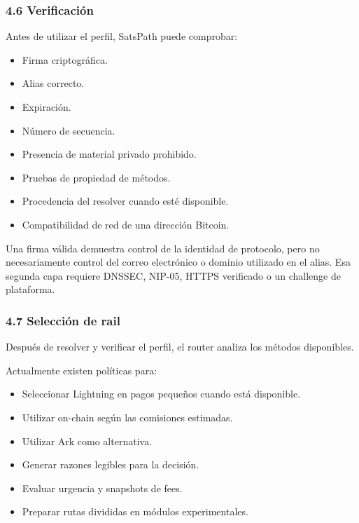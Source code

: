 \documentclass[
]{article}
\providecommand{\tightlist}{%
  \setlength{\itemsep}{0pt}\setlength{\parskip}{0pt}}
\begin{document}
\hypertarget{verificaciuxf3n}{%
\subsubsection{4.6 Verificación}\label{verificaciuxf3n}}

Antes de utilizar el perfil, SatsPath puede comprobar:

\begin{itemize}
\tightlist
\item
  Firma criptográfica.
\item
  Alias correcto.
\item
  Expiración.
\item
  Número de secuencia.
\item
  Presencia de material privado prohibido.
\item
  Pruebas de propiedad de métodos.
\item
  Procedencia del resolver cuando esté disponible.
\item
  Compatibilidad de red de una dirección Bitcoin.
\end{itemize}

Una firma válida demuestra control de la identidad de protocolo, pero no
necesariamente control del correo electrónico o dominio utilizado en el
alias. Esa segunda capa requiere DNSSEC, NIP-05, HTTPS verificado o un
challenge de plataforma.

\hypertarget{selecciuxf3n-de-rail}{%
\subsubsection{4.7 Selección de rail}\label{selecciuxf3n-de-rail}}

Después de resolver y verificar el perfil, el router analiza los métodos
disponibles.

Actualmente existen políticas para:

\begin{itemize}
\tightlist
\item
  Seleccionar Lightning en pagos pequeños cuando está disponible.
\item
  Utilizar on-chain según las comisiones estimadas.
\item
  Utilizar Ark como alternativa.
\item
  Generar razones legibles para la decisión.
\item
  Evaluar urgencia y snapshots de fees.
\item
  Preparar rutas divididas en módulos experimentales.
\end{itemize}
\end{document}
